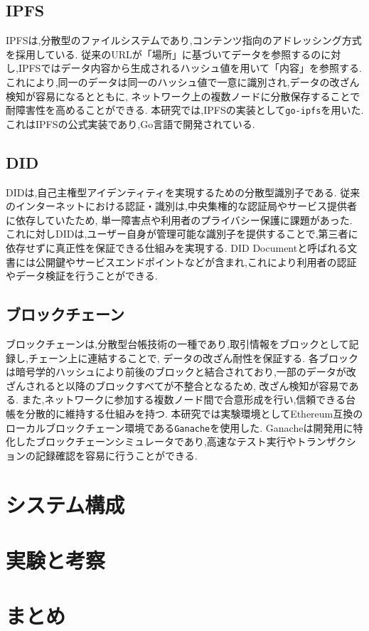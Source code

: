 \documentclass[a4paper,9pt,twocolumn]{ltjsarticle} %
\begin{document}
\subsection{IPFS}
IPFSは,分散型のファイルシステムであり,コンテンツ指向のアドレッシング方式を採用している.
従来のURLが「場所」に基づいてデータを参照するのに対し,IPFSではデータ内容から生成されるハッシュ値を用いて「内容」を参照する.
これにより,同一のデータは同一のハッシュ値で一意に識別され,データの改ざん検知が容易になるとともに,
ネットワーク上の複数ノードに分散保存することで耐障害性を高めることができる.
本研究では,IPFSの実装として\texttt{go-ipfs}を用いた.
これはIPFSの公式実装であり,Go言語で開発されている.

\subsection{DID}
DIDは,自己主権型アイデンティティを実現するための分散型識別子である.
従来のインターネットにおける認証・識別は,中央集権的な認証局やサービス提供者に依存していたため,
単一障害点や利用者のプライバシー保護に課題があった.
これに対しDIDは,ユーザー自身が管理可能な識別子を提供することで,第三者に依存せずに真正性を保証できる仕組みを実現する.
DID Documentと呼ばれる文書には公開鍵やサービスエンドポイントなどが含まれ,これにより利用者の認証やデータ検証を行うことができる.

\subsection{ブロックチェーン}
ブロックチェーンは,分散型台帳技術の一種であり,取引情報をブロックとして記録し,チェーン上に連結することで,
データの改ざん耐性を保証する.
各ブロックは暗号学的ハッシュにより前後のブロックと結合されており,一部のデータが改ざんされると以降のブロックすべてが不整合となるため,
改ざん検知が容易である.
また,ネットワークに参加する複数ノード間で合意形成を行い,信頼できる台帳を分散的に維持する仕組みを持つ.
本研究では実験環境としてEthereum互換のローカルブロックチェーン環境である\texttt{Ganache}を使用した.
Ganacheは開発用に特化したブロックチェーンシミュレータであり,高速なテスト実行やトランザクションの記録確認を容易に行うことができる.

\section{システム構成}

\section{実験と考察}

\section{まとめ}



\end{document}
